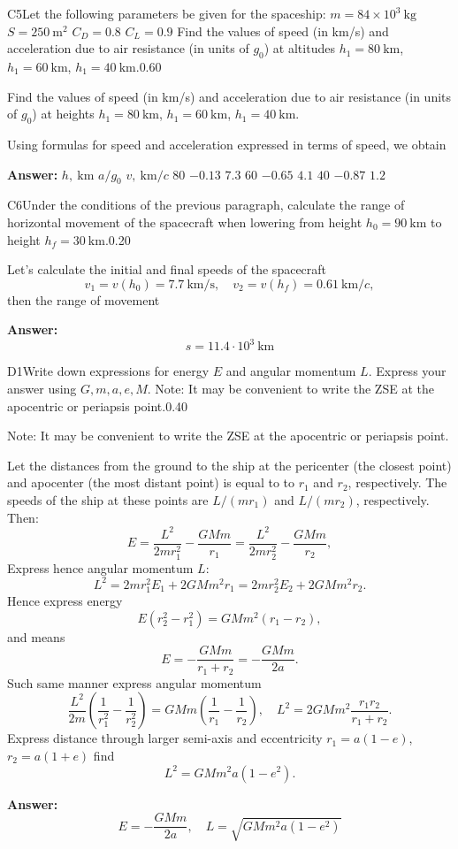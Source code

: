 \documentclass[11pt,a4paper]{article}
\begin{document}
\begin{solcard}{C5}{Let the following parameters be given for the spaceship: $m  = 84 \times 10^3~\text{kg}$ $S = 250~\text{m}^2$ $C_D = 0.8$ $C_L = 0.9$ Find the values of speed (in km/s) and acceleration due to air resistance (in units of $g_0$) at altitudes $h_1 = 80~\text{km}$, $h_1 = 60~\text{km}$, $h_1 = 40~\text{km}$.}{0.60}

Find the values of speed (in km/s) and acceleration due to air resistance (in units of $g_0$) at heights $h_1 = 80~\text{km}$, $h_1 = 60~\text{km}$, $h_1 = 40~\text{km}$.


Using formulas for speed and acceleration expressed in terms of speed, we obtain

\par\smallskip\noindent\textbf{Answer:} $h, ~\mathrm{km}$ $a/g_0$ $v, ~\mathrm{km}/c$ $80$ $-0.13$ $7.3$ $60$ $-0.65$ $4.1$ $40$ $-0.87$ $1.2$
\end{solcard}

\begin{solcard}{C6}{Under the conditions of the previous paragraph, calculate the range of horizontal movement of the spacecraft when lowering from height $h_0 = 90~\text{km}$ to height $h_f = 30~\text{km}$.}{0.20}

Let's calculate the initial and final speeds of the spacecraft $$v_1 = v(h_0)=7.7~ \mathrm{km}/\mathrm{s}, \quad v_2 = v(h_f)=0.61~\mathrm{km}/c,$$then the range of movement

\par\smallskip\noindent\textbf{Answer:} $$s=11.4\cdot 10^3~ \mathrm{km}$$
\end{solcard}

\begin{solcard}{D1}{Write down expressions for energy $E$ and angular momentum $L$. Express your answer using $G, m, a, e, M$. Note: It may be convenient to write the ZSE at the apocentric or periapsis point.}{0.40}

Note: It may be convenient to write the ZSE at the apocentric or periapsis point.


Let the distances from the ground to the ship at the pericenter (the closest point) and apocenter (the most distant point) is equal to to $r_1$ and $r_2$, respectively. The speeds of the ship at these points are $L/(mr_1)$ and $L/(mr_2)$, respectively. Then: $$E =  \frac{L^2}{2 mr_1^2} - \frac{GMm}{r_1} =   \frac{L^2}{2 m r_2^2} - \frac{GMm}{r_2},$$Express hence angular momentum  $L$: $$ L^2 = 2 m r_1^2 E_1+ 2 GMm^2 r_1 = 2 m r_2^2 E_2 + 2 GMm^2 r_2. $$Hence express energy $$ E (r_2^2 - r_1^2) = GMm^2 (r_1  - r_2), $$and means $$ E = - \frac{GMm}{r_1 + r_2} = - \frac{GMm}{2a}. $$Such same manner express angular momentum $$ \frac{L^2}{2 m} \left( \frac{1}{r_1^2} - \frac{1}{r_2^2}\right) = GMm \left(\frac{1}{r_1} - \frac{1}{r_2} \right), \quad L^2 = 2G Mm^2 \frac{r_1 r_2}{r_1 + r_2}. $$Express distance through larger semi-axis and eccentricity $r_1 = a (1-e)$, $r_2 = a (1+ e)$ find $$ L^2 = G Mm^2 a (1-e^2). $$

\par\smallskip\noindent\textbf{Answer:} $$E=-\dfrac{GMm}{2a}, \quad L = \sqrt{GMm^2a(1-e^2)}$$
\end{solcard}
\end{document}
